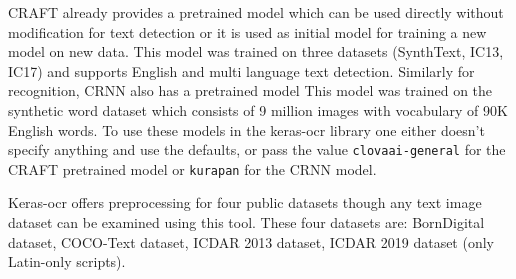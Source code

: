 CRAFT already provides a pretrained model which can be used directly without modification for text detection or it is used as initial model for training a new model on new data. This model was trained on three datasets (SynthText, IC13, IC17) and supports English and multi language text detection. \cite{craft1}
Similarly for recognition, CRNN also has a pretrained model  This model was trained on the synthetic word dataset which consists of 9 million images with vocabulary of 90K English words. \cite{synth}
To use these models in the keras-ocr library one either doesn't specify anything and use the defaults, or pass the value \texttt{clovaai-general} for the CRAFT pretrained model or \texttt{kurapan} for the CRNN model.

Keras-ocr offers preprocessing for four public datasets though any text image dataset can be examined using this tool. These four datasets are: BornDigital dataset, COCO-Text dataset, ICDAR 2013 dataset, ICDAR 2019 dataset (only Latin-only scripts).\cite{keras-ocrDocu}

